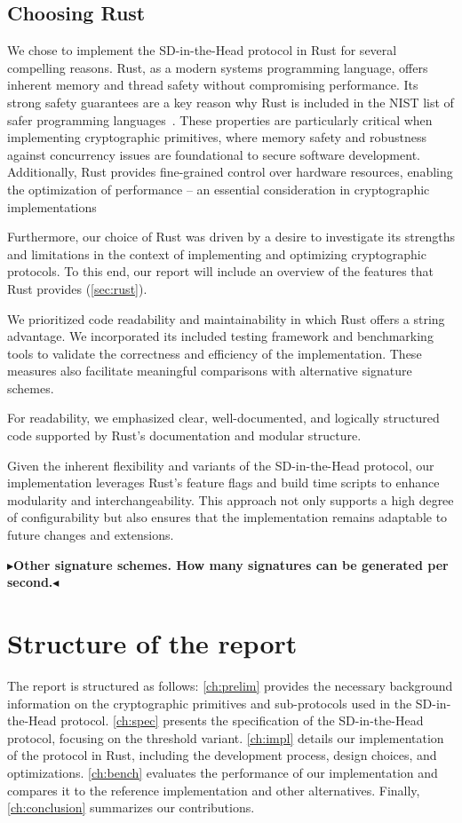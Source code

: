 \documentclass[11pt]{report}
\theoremstyle{definition}
\theoremstyle{plain}
\newcommand{\todo}[1]{{\color[rgb]{.5,0,0}\textbf{$\blacktriangleright$#1$\blacktriangleleft$}}}
\begin{document}
\subsection{Choosing Rust}
We chose to implement the SD-in-the-Head protocol in Rust for several compelling reasons. Rust, as a modern systems programming language, offers inherent memory and thread safety without compromising performance. Its strong safety guarantees\cite{jung2017rustbelt} are a key reason why Rust is included in the NIST list of safer programming languages~\cite{nistsaferlanguages}. These properties are particularly critical when implementing cryptographic primitives, where memory safety and robustness against concurrency issues are foundational to secure software development. Additionally, Rust provides fine-grained control over hardware resources, enabling the optimization of performance -- an essential consideration in cryptographic implementations

Furthermore, our choice of Rust was driven by a desire to investigate its strengths and limitations in the context of implementing and optimizing cryptographic protocols. To this end, our report will include an overview of the features that Rust provides (\autoref{sec:rust}).

We prioritized code readability and maintainability in which Rust offers a string advantage. We incorporated its included testing framework and benchmarking tools to validate the correctness and efficiency of the implementation. These measures also facilitate meaningful comparisons with alternative signature schemes.

For readability, we emphasized clear, well-documented, and logically structured code supported by Rust's documentation and modular structure.

Given the inherent flexibility and variants of the SD-in-the-Head protocol, our implementation leverages Rust's feature flags and build time scripts to enhance modularity and interchangeability. This approach not only supports a high degree of configurability but also ensures that the implementation remains adaptable to future changes and extensions.

\todo{Other signature schemes. How many signatures can be generated per second.}

\section{Structure of the report}
The report is structured as follows: \autoref{ch:prelim} provides the necessary background information on the cryptographic primitives and sub-protocols used in the SD-in-the-Head protocol. \autoref{ch:spec} presents the specification of the SD-in-the-Head protocol, focusing on the threshold variant. \autoref{ch:impl} details our implementation of the protocol in Rust, including the development process, design choices, and optimizations. \autoref{ch:bench} evaluates the performance of our implementation and compares it to the reference implementation and other alternatives. Finally, \autoref{ch:conclusion} summarizes our contributions.
\end{document}
